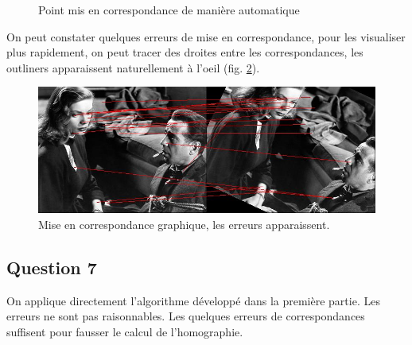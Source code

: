 \documentclass{article}
\begin{document}
\begin{figure}[!ht]%
  \centering
  \hspace{0.030\textwidth}
  \caption{Point mis en correspondance de manière automatique}
  \label{corres}
\end{figure}

On peut constater quelques erreurs de mise en correspondance, pour les visualiser plus rapidement, on peut
tracer des droites entre les correspondances, les outliners apparaissent naturellement à l'oeil (fig.
\ref{corres2}).

\begin{figure}[!ht]
    \center
    \includegraphics[width=1\textwidth]{img/resultat_I.jpg}
    \caption{Mise en correspondance graphique, les erreurs apparaissent.}
    \label{corres2}
\end{figure}

\subsection{Question 7}
On applique directement l'algorithme développé dans la première partie. Les erreurs ne sont pas raisonnables.
Les quelques erreurs de correspondances suffisent pour fausser le calcul de l'homographie.
\end{document}
